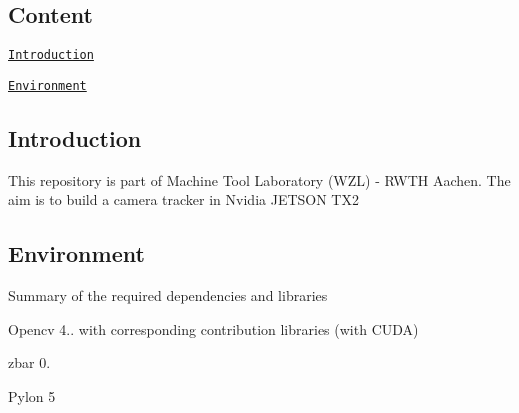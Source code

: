 \subsection*{Content}


\begin{DoxyItemize}
\item \href{#introduction}{\tt Introduction}
\item \href{#environment}{\tt Environment} 


\end{DoxyItemize}

\subsection*{Introduction}

This repository is part of Machine Tool Laboratory (W\+ZL) -\/ R\+W\+TH Aachen. The aim is to build a camera tracker in Nvidia J\+E\+T\+S\+ON T\+X2 



\subsection*{Environment}

Summary of the required dependencies and libraries 




\begin{DoxyItemize}
\item Opencv 4.. with corresponding contribution libraries (with C\+U\+DA)
\item zbar 0.
\item Pylon 5 
\end{DoxyItemize}